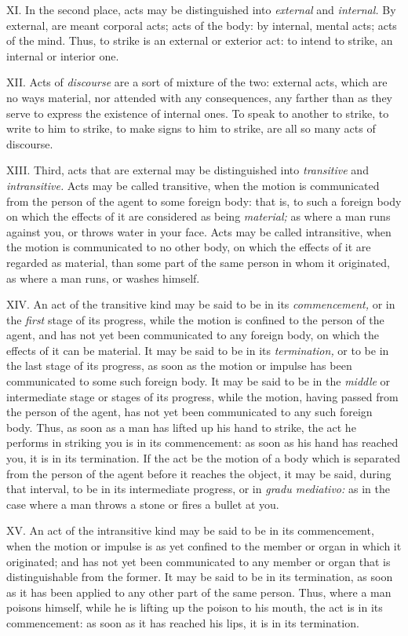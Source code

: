 \documentclass[12pt]{report}
\begin{document}
XI. In the second place, acts may be distinguished into \emph{external}
and \emph{internal.} By external, are meant corporal acts; acts of the
body: by internal, mental acts; acts of the mind. Thus, to strike is an
external or exterior act: to intend to strike, an internal or interior
one.

XII. Acts of \emph{discourse} are a sort of mixture of the two: external
acts, which are no ways material, nor attended with any consequences,
any farther than as they serve to express the existence of internal
ones. To speak to another to strike, to write to him to strike, to make
signs to him to strike, are all so many acts of discourse.

XIII. Third, acts that are external may be distinguished into
\emph{transitive} and \emph{intransitive.} Acts may be called
transitive, when the motion is communicated from the person of the agent
to some foreign body: that is, to such a foreign body on which the
effects of it are considered as being \emph{material;} as where a man
runs against you, or throws water in your face. Acts may be called
intransitive, when the motion is communicated to no other body, on which
the effects of it are regarded as material, than some part of the same
person in whom it originated, as where a man runs, or washes himself.

XIV. An act of the transitive kind may be said to be in its
\emph{commencement,} or in the \emph{first} stage of its progress, while
the motion is confined to the person of the agent, and has not yet been
communicated to any foreign body, on which the effects of it can be
material. It may be said to be in its \emph{termination,} or to be in
the last stage of its progress, as soon as the motion or impulse has
been communicated to some such foreign body. It may be said to be in the
\emph{middle} or intermediate stage or stages of its progress, while the
motion, having passed from the person of the agent, has not yet been
communicated to any such foreign body. Thus, as soon as a man has lifted
up his hand to strike, the act he performs in striking you is in its
commencement: as soon as his hand has reached you, it is in its
termination. If the act be the motion of a body which is separated from
the person of the agent before it reaches the object, it may be said,
during that interval, to be in its intermediate progress, or in
\emph{gradu mediativo:} as in the case where a man throws a stone or
fires a bullet at you.

XV. An act of the intransitive kind may be said to be in its
commencement, when the motion or impulse is as yet confined to the
member or organ in which it originated; and has not yet been
communicated to any member or organ that is distinguishable from the
former. It may be said to be in its termination, as soon as it has been
applied to any other part of the same person. Thus, where a man poisons
himself, while he is lifting up the poison to his mouth, the act is in
its commencement: as soon as it has reached his lips, it is in its
termination.
\end{document}

